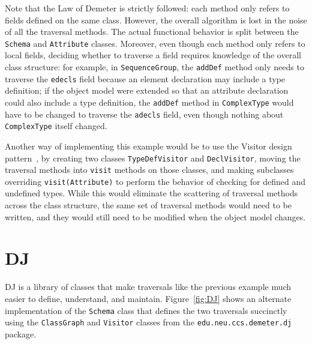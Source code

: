 \documentclass{llncs}
\newcommand{\code}[1]{\texttt{#1}}
\begin{document}
Note that the Law of Demeter is strictly followed: each method only
refers to fields defined on the same class.  However, the overall
algorithm is lost in the noise of all the traversal methods.
The actual functional behavior is split between the \code{Schema} and
\code{Attribute} classes.  Moreover, even though each method only
refers to local fields, deciding whether to traverse a field requires
knowledge of the overall class structure: for example, in
\code{SequenceGroup}, the \code{addDef} method only needs to
traverse the \code{edecls} field because an element declaration may
include a type definition; if the object model were extended so that an
attribute declaration could also include a type definition, the
\code{addDef} method in \code{ComplexType} would have to be changed to
traverse the \code{adecls} field, even though nothing about
\code{ComplexType} itself changed.

Another way of implementing this example would be to use the Visitor
design pattern~\cite{gang-of-4}, by creating two classes
\code{TypeDefVisitor} and \code{DeclVisitor}, moving the traversal
methods into \code{visit} methods on those classes, and making
subclasses overriding \code{visit(Attribute)} to perform the behavior
of checking for defined and undefined types.  While this would
eliminate the scattering of traversal methods across the class
structure, the same set of traversal methods would need to be written,
and they would still need to be modified when the object model
changes.

\section{DJ}

DJ is a library of classes that make traversals like the previous
example much easier to define, understand, and maintain.
Figure~\ref{fig:DJ} shows an alternate implementation of the
\code{Schema} class that defines the two traversals succinctly
using the \code{ClassGraph} and \code{Visitor} classes from the
\code{edu.neu.ccs.demeter.dj} package.
\end{document}

